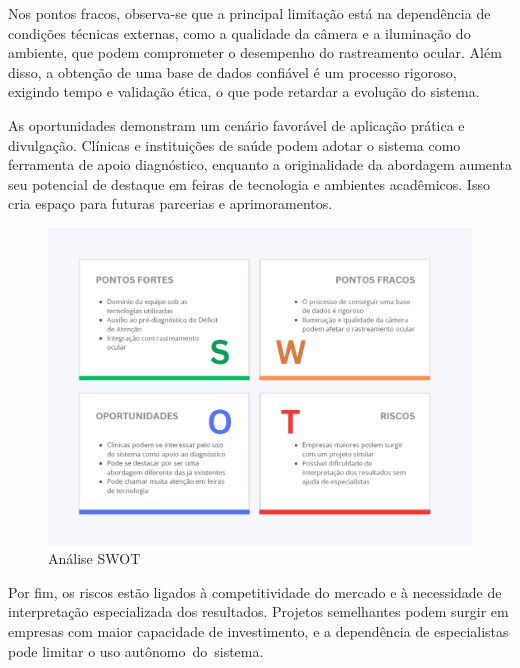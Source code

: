 \documentclass[
  a4paper,%
  12pt,%
  english,%
  brazilian,%
]{article}
\begin{document}
Nos pontos fracos, observa-se que a principal limitação está na dependência de condições técnicas externas, como a qualidade da câmera e a iluminação do ambiente, que podem comprometer o desempenho do rastreamento ocular. Além disso, a obtenção de uma base de dados confiável é um processo rigoroso, exigindo tempo e validação ética, o que pode retardar a evolução do sistema.

As oportunidades demonstram um cenário favorável de aplicação prática e divulgação. Clínicas e instituições de saúde podem adotar o sistema como ferramenta de apoio diagnóstico, enquanto a originalidade da abordagem aumenta seu potencial de destaque em feiras de tecnologia e ambientes acadêmicos. Isso cria espaço para futuras parcerias e aprimoramentos.

\begin{figure}[H]
\centering
\caption{Análise SWOT}%
\label{fig:analise-swot}
\includegraphics[width=1.1\textwidth]{Logos/swot.png}
\end{figure}

    Por fim, os riscos estão ligados à competitividade do mercado e à necessidade de interpretação especializada dos resultados. Projetos semelhantes podem surgir em empresas com maior capacidade de investimento, e a dependência de especialistas pode limitar o uso autônomo do sistema.
\end{document}
